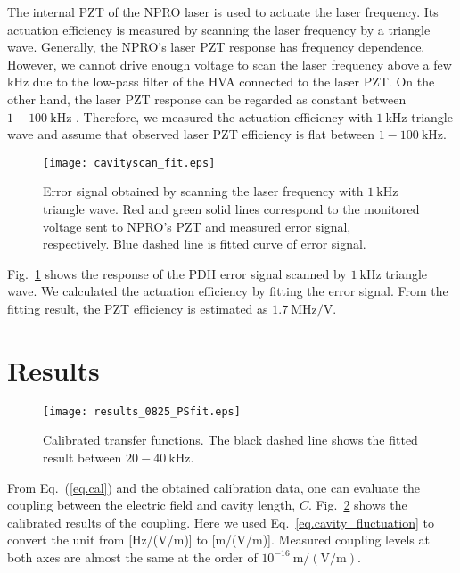 \documentclass[%
 reprint,
 superscriptaddress,
 amsmath,amssymb,
 aps,
]{revtex4-2}
\newcommand{\unit}[1]{\ \mathrm{#1}}
\begin{document}
The internal PZT of the NPRO laser is used to actuate the laser frequency.
Its actuation efficiency is measured by scanning the laser frequency by a triangle wave.
Generally, the NPRO's laser PZT response has frequency dependence.
However, we cannot drive enough voltage to scan the laser frequency above a few kHz due to the low-pass filter of the HVA connected to the laser PZT.
On the other hand, the laser PZT response can be regarded as constant between $1 - 100\unit{kHz}$ \cite{klog}.
Therefore, we measured the actuation efficiency with $1\unit{kHz}$ triangle wave and assume that observed laser PZT efficiency is flat between $1 - 100 \unit{kHz}$.


\begin{figure}[htbp]
\texttt{[image: cavityscan\_fit.eps]}
\caption{
Error signal obtained by scanning the laser frequency with $1\unit{kHz}$ triangle wave.
Red and green solid lines correspond to the monitored voltage sent to NPRO's PZT and measured error signal, respectively.
Blue dashed line is fitted curve of error signal.
}
\label{fig.scan}
\end{figure}

Fig.~\ref{fig.scan} shows the response of the PDH error signal scanned by $1\unit{kHz}$ triangle wave.
We calculated the actuation efficiency by fitting the error signal.
From the fitting result, the PZT efficiency is estimated as $1.7\unit{MHz/V}$.



\section{Results}

\begin{figure}[htbp]
\texttt{[image: results\_0825\_PSfit.eps]}
\caption{
Calibrated transfer functions.
The black dashed line shows the fitted result between $20 - 40\unit{kHz}$.
}
\label{fig.result}
\end{figure}

From Eq.~(\ref{eq.cal}) and the obtained calibration data, one can evaluate the coupling between the electric field and cavity length, $C$.
Fig.~\ref{fig.result} shows the calibrated results of the coupling. 
Here we used Eq.~\ref{eq.cavity_fluctuation} to convert the unit from [Hz/(V/m)] to [m/(V/m)].
Measured coupling levels at both axes are almost the same at the order of $10^{-16}\unit{m/(V/m)}$.
\end{document}
